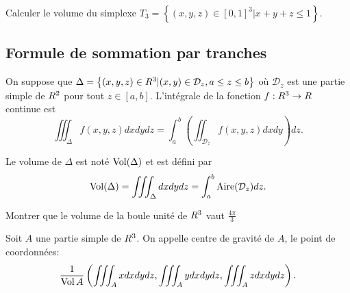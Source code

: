 \begin{exemple}
	Calculer le volume du simplexe $T_3 = \left\{ (x,y,z) \in [0,1]^3 | x+y+z \leq 1 \right\}$.
\pl{\rep{12cm}}
\end{exemple}

\subsection{Formule de sommation par tranches}

\begin{definition}
	On suppose que $\Delta = \left\{ (x,y,z) \in R^3 | (x,y) \in \mathcal D_z, a\leq z \leq b \right\}$ où $\mathcal D_z$ est une partie simple de $R^2$ pour tout $z \in [a,b]$.
	L'intégrale de la fonction $f:R^3 \to R$ continue est 
	\[
		\iiint_{\Delta} f(x,y,z) dxdydz = \int_a^b \left( \iint_{\mathcal D_z} f(x,y,z) dxdy \right) dz.
	\]
\end{definition}


\begin{definition}
	Le volume de $\Delta$ est noté $\operatorname{Vol}(\Delta)$ et est défini par 
	\[
		\operatorname{Vol} (\Delta) =  \iiint_{\Delta} dxdydz = \int_a^b \operatorname{Aire}(\mathcal D_z ) dz.
	\]
\end{definition}

\begin{exemple}
	Montrer que le volume de la boule unité de $R^3$ vaut $\frac{4\pi}{3}$
        \pl{\rep{5cm}\rep{7cm}}
\end{exemple}

\begin{definition}
	Soit  $A$  une partie simple de $R^3$. On appelle centre de gravité de $A$, le point de coordonnées:
	\[
            \frac{1}{\operatorname{Vol} A} \left( \iiint_A x dxdydz, \iiint_A y dxdydz , \iiint_A z dxdydz \right).
	\]
\end{definition}
\sld{\vfill\pagebreak[5]}%

